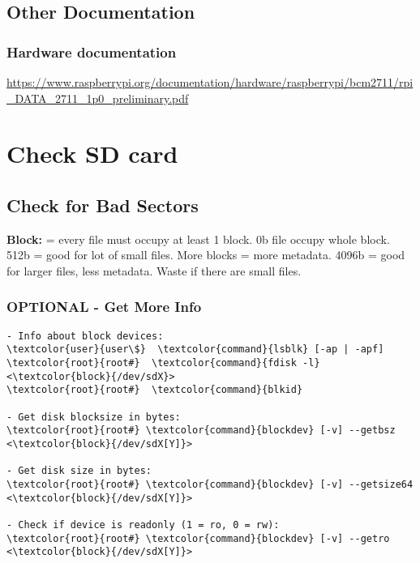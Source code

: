 \documentclass[10pt, a4paper, onecolumn, openany]{book} %
\begin{document}
\section{Other Documentation}
\subsection{Hardware documentation}
\url{https://www.raspberrypi.org/documentation/hardware/raspberrypi/bcm2711/rpi_DATA_2711_1p0_preliminary.pdf}


\chapter{Check SD card}
\section{Check for Bad Sectors}
\textbf{Block:} = every file must occupy at least 1 block. 0b file occupy whole block.\newline
512b = good for lot of small files. More blocks = more metadata.\newline
4096b =  good for larger files, less metadata. Waste if there are small files.
\subsection{OPTIONAL - Get More Info}
\begin{Verbatim}[commandchars=\\\{\}]
- Info about block devices:
\textcolor{user}{user\$}  \textcolor{command}{lsblk} [-ap | -apf]
\textcolor{root}{root#}  \textcolor{command}{fdisk -l} <\textcolor{block}{/dev/sdX}>
\textcolor{root}{root#}  \textcolor{command}{blkid}

- Get disk blocksize in bytes:
\textcolor{root}{root#} \textcolor{command}{blockdev} [-v] --getbsz <\textcolor{block}{/dev/sdX[Y]}>

- Get disk size in bytes:
\textcolor{root}{root#} \textcolor{command}{blockdev} [-v] --getsize64 <\textcolor{block}{/dev/sdX[Y]}>

- Check if device is readonly (1 = ro, 0 = rw):
\textcolor{root}{root#} \textcolor{command}{blockdev} [-v] --getro <\textcolor{block}{/dev/sdX[Y]}>
\end{Verbatim}
\end{document}
